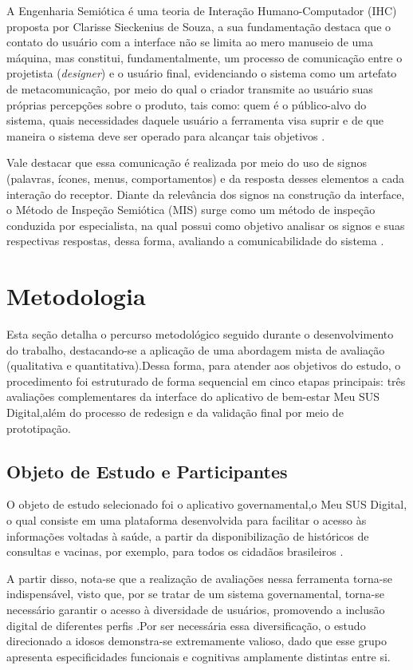 \documentclass[12pt]{article}
\begin{document}
\begin{abstractp}
A Engenharia Semiótica é uma teoria de Interação Humano-Computador (IHC) proposta por Clarisse Sieckenius de Souza,  a sua fundamentação destaca que o contato do usuário com a interface não se limita ao mero manuseio de uma máquina, mas constitui, fundamentalmente, um processo de comunicação entre o projetista (\textit{designer}) e o usuário final, evidenciando  o sistema como um artefato de metacomunicação, por meio do qual o criador transmite ao usuário suas próprias percepções sobre o produto, tais como: quem é o público-alvo do sistema, quais necessidades daquele usuário a ferramenta visa suprir e de que maneira o sistema deve ser operado para alcançar tais objetivos \cite{desouza2005}. 

Vale destacar que essa comunicação é realizada por meio do uso de signos (palavras, ícones, menus, comportamentos) e da resposta desses elementos a cada interação do receptor. Diante da relevância dos signos na construção da interface, o Método de Inspeção Semiótica (MIS) surge como um método de inspeção conduzida por especialista, na qual possui como objetivo analisar os signos e suas respectivas respostas, dessa forma, avaliando a comunicabilidade do sistema \cite{desouza2005}.

 \section{Metodologia} \label{sec:metodologia}
 Esta seção detalha o percurso metodológico seguido durante o desenvolvimento do trabalho, destacando-se a aplicação de uma abordagem mista de avaliação (qualitativa e quantitativa).Dessa forma, para atender aos objetivos do estudo, o procedimento foi estruturado de forma sequencial em cinco etapas principais: três avaliações complementares da interface do aplicativo de bem-estar Meu SUS Digital,além do processo de redesign e da validação final por meio de prototipação. 
 
\subsection{Objeto de Estudo e Participantes} \label{sec:objeto_participantes}
O objeto de estudo selecionado foi o aplicativo governamental,o Meu SUS Digital, o qual consiste em uma plataforma desenvolvida para facilitar o acesso às informações voltadas à saúde, a partir da disponibilização de históricos de consultas e vacinas, por exemplo, para todos os cidadãos brasileiros \cite{meususdigital}. 

A partir disso, nota-se que a realização de avaliações nessa ferramenta torna-se indispensável, visto que, por se tratar de um sistema governamental, torna-se necessário garantir o acesso à diversidade de usuários, promovendo a inclusão digital de diferentes perfis \cite{barbosa2010ihc}.Por ser necessária essa diversificação, o estudo direcionado a idosos demonstra-se extremamente valioso, dado que esse grupo apresenta especificidades funcionais e cognitivas amplamente distintas entre si.



\end{abstractp}
\end{document}
